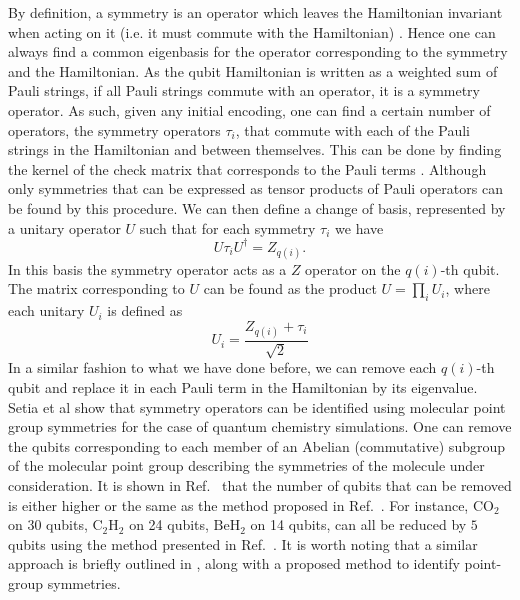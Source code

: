 By definition, a symmetry is an operator which leaves the Hamiltonian invariant when acting on it (i.e. it must commute with the Hamiltonian) \cite{messiah2014quantum}. Hence one can always find a common eigenbasis for the operator corresponding to the symmetry and the Hamiltonian. As the qubit Hamiltonian is written as a weighted sum of Pauli strings, if all Pauli strings commute with an operator, it is a symmetry operator. As such, given any initial encoding, one can find a certain number of operators, the symmetry operators $\tau_i$, that commute with each of the Pauli strings in the Hamiltonian and between themselves. This can be done by finding the kernel of the check matrix that corresponds to the Pauli terms \cite{bravyi_tapering_2017}. Although only symmetries that can be expressed as tensor products of Pauli operators can be found by this procedure. We can then define a change of basis, represented by a unitary operator $U$ such that for each symmetry $\tau_i$ we have
\begin{equation}
    U \tau_i U^\dagger = Z_{q(i)}.
\end{equation}
In this basis the symmetry operator acts as a $Z$ operator on the $q(i)$-th qubit. The matrix corresponding to $U$ can be found as the product $U = \prod_i U_i$, where each unitary $U_i$ is defined as
\begin{equation}
    U_i = \frac{Z_{q(i)} + \tau_i}{\sqrt{2}}
\end{equation}
In a similar fashion to what we have done before, we can remove each $q(i)$-th qubit and replace it in each Pauli term in the Hamiltonian by its eigenvalue. Setia et al \cite{Setia2020} show that symmetry operators can be identified using molecular point group symmetries \cite{cotton1990chemical} for the case of quantum chemistry simulations. One can remove the qubits corresponding to each member of an Abelian (commutative) subgroup of the molecular point group describing the symmetries of the molecule under consideration. It is shown in Ref.~ \cite{Setia2020} that the number of qubits that can be removed is either higher or the same as the method proposed in Ref.~\cite{bravyi_tapering_2017}. For instance, $\mathrm{CO_2}$ on $30$ qubits, $\mathrm{C_2H_2}$ on 24 qubits, $\mathrm{BeH_2}$ on 14 qubits, can all be reduced by $5$ qubits using the method presented in Ref.~\cite{Setia2020}. It is worth noting that a similar approach is briefly outlined in \cite{Zhang2021_shallow}, along with a proposed method to identify point-group symmetries. 


